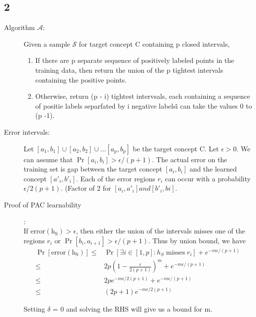 \documentclass{article}
\begin{document}
\subsection*{2}
\begin{description}
  \item[Algorithm \( \mathcal{A} \):]  Given a sample \( \mathcal{S}\) for target concept C containing p closed intervals,
    \begin{enumerate}
      \item If there are p separate sequence of positively labeled points in the training data, then return the union of the p tightest intervals containing the positive points.
      \item Otherwise, return (p - i) tightest intervsals, each containing a sequence of positie labels separfated by i negative labels\.  i can take the values 0 to (p -1).
    \end{enumerate}
  \item[Error intervals:] Let \( [a_{1}, b_{1}] \cup [a_{2}, b_{2}] \cup ... [a_{p}, b_{p}] \) be the target concept C.  Let \( \epsilon > 0\). We can assume that \(\Pr[a_{i}, b_{i}] > \epsilon/(p + 1) \).  The actual error on the training set is gap between the target concept \( [a_{i}, b_{i}]\) and the learned concept \( [a'_{i}, b'_{i}] \).  Each of the error regions \( r_{i}\) can occur with a probability \( \epsilon/2(p + 1) \). (Factor of 2 for \( [a_{i}, a'_{i}] and [b'_{i}, b{i}] \).
  \item[Proof of PAC learnability]:\\
    If \( \mathrm{error(h_{S})} > \epsilon\), then either the union of the intervals misses one of the regions \( r_{i} \) or \( \Pr[b_{i}, a_{i+1}] > \epsilon/(p+1)\).  Thus by union bound, we have
    \begin{align*}
      \Pr[\mathrm{error(h_{S})}] \le & \Pr[\exists{i} \in [1, p]: h_{S} \; \mathrm{misses} \; r_{i}] + e^{-m\epsilon/(p+1)}\\
      \le & 2p(1-\frac{\epsilon}{2(p+1)})^{m} + e^{-m\epsilon/(p+1)}\\
      \le & 2pe^{-m\epsilon/{2(p+1)}} + e^{-m\epsilon/(p+1)}\\
      \le & (2p+1)e^{-m\epsilon/2(p+1)}
    \end{align*}

    Setting \( \delta \) = 0 and solving the RHS will give us a bound for m.


\end{description}
\end{document}
